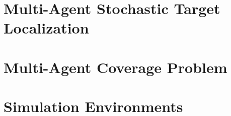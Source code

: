 \section{Multi-Agent Stochastic Target Localization}


\section{Multi-Agent Coverage Problem}


\section{Simulation Environments}


